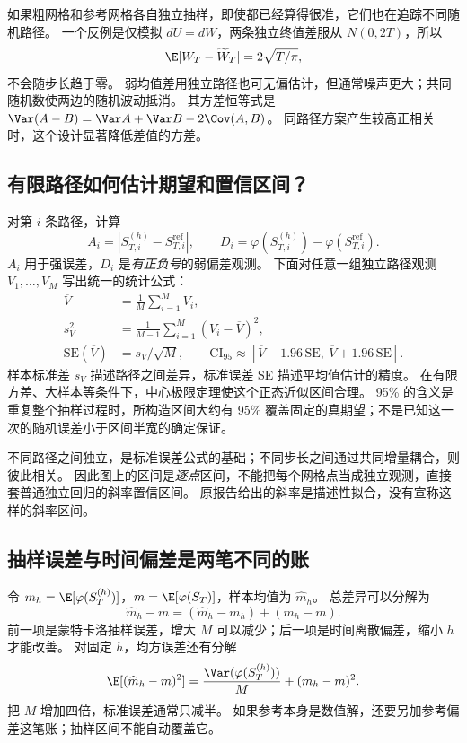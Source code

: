 如果粗网格和参考网格各自独立抽样，即使都已经算得很准，它们也在追踪不同随机路径。
一个反例是仅模拟 $dU=dW$，两条独立终值差服从 $N(0,2T)$，所以
\begin{equation}\label{eq:errors-independent-counterexample}
 \E|W_T-\widetilde W_T|=2\sqrt{T/\pi},
\end{equation}
不会随步长趋于零。
弱均值差用独立路径也可无偏估计，但通常噪声更大；共同随机数使两边的随机波动抵消。
其方差恒等式是 $\Var(A-B)=\Var A+\Var B-2\Cov(A,B)$。
同路径方案产生较高正相关时，这个设计显著降低差值的方差。

\subsection{有限路径如何估计期望和置信区间？}
对第 $i$ 条路径，计算
\begin{equation}\label{eq:errors-observations}
 A_i=|S_{T,i}^{(h)}-S_{T,i}^{\mathrm{ref}}|,\qquad
 D_i=\varphi(S_{T,i}^{(h)})-\varphi(S_{T,i}^{\mathrm{ref}}).
\end{equation}
$A_i$ 用于强误差，$D_i$ 是\emph{有正负号}的弱偏差观测。
下面对任意一组独立路径观测 $V_1,\ldots,V_M$ 写出统一的统计公式：
\begin{align}
 \overline V&=\frac1M\sum_{i=1}^M V_i,\label{eq:errors-sample-mean}\\
 s_V^2&=\frac1{M-1}\sum_{i=1}^M(V_i-\overline V)^2,\label{eq:errors-sample-var}\\
 \mathrm{SE}(\overline V)&=s_V/\sqrt M,\qquad
 \mathrm{CI}_{95}\approx[\overline V-1.96\,\mathrm{SE},\ \overline V+1.96\,\mathrm{SE}].\label{eq:errors-ci}
\end{align}
样本标准差 $s_V$ 描述路径之间差异，标准误差 SE 描述平均值估计的精度。
在有限方差、大样本等条件下，中心极限定理使这个正态近似区间合理。
95\% 的含义是重复整个抽样过程时，所构造区间大约有 95\% 覆盖固定的真期望；不是已知这一次的随机误差小于区间半宽的确定保证。

不同路径之间独立，是标准误差公式的基础；不同步长之间通过共同增量耦合，则彼此相关。
因此图上的区间是\emph{逐点}区间，不能把每个网格点当成独立观测，直接套普通独立回归的斜率置信区间。
原报告给出的斜率是描述性拟合，没有宣称这样的斜率区间。

\subsection{抽样误差与时间偏差是两笔不同的账}
令 $m_h=\E[\varphi(S_T^{(h)})]$，$m=\E[\varphi(S_T)]$，样本均值为 $\widehat m_h$。
总差异可以分解为
\begin{equation}\label{eq:errors-decomposition}
 \widehat m_h-m=(\widehat m_h-m_h)+(m_h-m).
\end{equation}
前一项是蒙特卡洛抽样误差，增大 $M$ 可以减少；后一项是时间离散偏差，缩小 $h$ 才能改善。
对固定 $h$，均方误差还有分解
\begin{equation}\label{eq:errors-mse}
 \E[(\widehat m_h-m)^2]=\frac{\Var(\varphi(S_T^{(h)}))}{M}+(m_h-m)^2.
\end{equation}
把 $M$ 增加四倍，标准误差通常只减半。
如果参考本身是数值解，还要另加参考偏差这笔账；抽样区间不能自动覆盖它。

